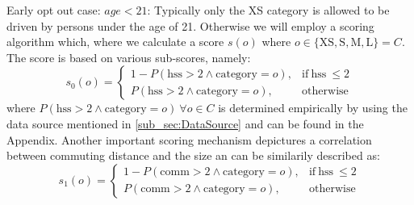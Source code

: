 Early opt out case: $age < 21$: Typically only the XS category is allowed to be driven by persons under the age of 21.
Otherwise we will employ a scoring algorithm which, where we calculate a score $s(o)$ where 
$o \in \{ \textrm{XS}, \textrm{S}, \textrm{M}, \textrm{L} \} = C$. The score is based on various sub-scores, namely:
$$
s_0(o) = 
\begin{cases}
  1 - P(\text{hss} > 2 \land \text{category} = o), & \text{if}\ \text{hss}\ \le 2 \\
  P(\text{hss} > 2 \land \text{category} = o), & \text{otherwise}
\end{cases}
$$
where $P(\text{hss} > 2 \land \text{category} = o) \ \forall o \in C$ is determined empirically by using the data source 
mentioned in \ref{sub_sec:DataSource} and can be found in the Appendix. Another important 
scoring mechanism depictures a correlation between commuting distance and the size an can be similarily described as:
$$
s_1(o) = 
\begin{cases}
  1 - P(\text{comm} > 2 \land \text{category} = o), & \text{if}\ \text{hss}\ \le 2 \\
  P(\text{comm} > 2 \land \text{category} = o), & \text{otherwise}
\end{cases}
$$

